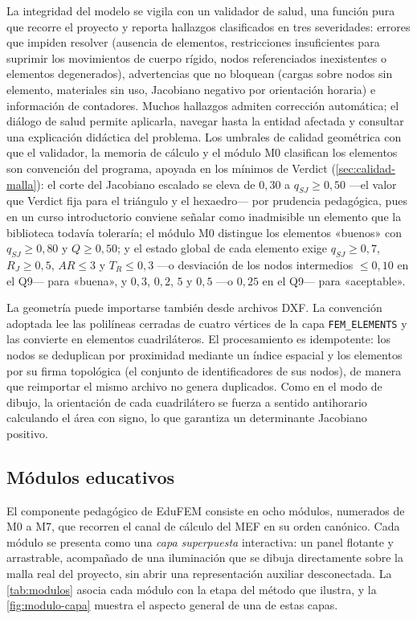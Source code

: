 La integridad del modelo se vigila con un validador de salud, una función pura que recorre el proyecto y reporta hallazgos clasificados en tres severidades: errores que impiden resolver (ausencia de elementos, restricciones insuficientes para suprimir los movimientos de cuerpo rígido, nodos referenciados inexistentes o elementos degenerados), advertencias que no bloquean (cargas sobre nodos sin elemento, materiales sin uso, Jacobiano negativo por orientación horaria) e información de contadores. Muchos hallazgos admiten corrección automática; el diálogo de salud permite aplicarla, navegar hasta la entidad afectada y consultar una explicación didáctica del problema. Los umbrales de calidad geométrica con que el validador, la memoria de cálculo y el módulo M0 clasifican los elementos son convención del programa, apoyada en los mínimos de Verdict (\autoref{sec:calidad-malla}): el corte del Jacobiano escalado se eleva de $0{,}30$ a $q_{SJ} \ge 0{,}50$ —el valor que Verdict fija para el triángulo y el hexaedro— por prudencia pedagógica, pues en un curso introductorio conviene señalar como inadmisible un elemento que la biblioteca todavía toleraría; el módulo M0 distingue los elementos «buenos» con $q_{SJ} \ge 0{,}80$ y $Q \ge 0{,}50$; y el estado global de cada elemento exige $q_{SJ} \ge 0{,}7$, $R_J \ge 0{,}5$, $AR \le 3$ y $T_R \le 0{,}3$ —o desviación de los nodos intermedios $\le 0{,}10$ en el Q9— para «buena», y $0{,}3$, $0{,}2$, $5$ y $0{,}5$ —o $0{,}25$ en el Q9— para «aceptable».

La geometría puede importarse también desde archivos DXF. La convención adoptada lee las polilíneas cerradas de cuatro vértices de la capa \texttt{FEM\_ELEMENTS} y las convierte en elementos cuadriláteros. El procesamiento es idempotente: los nodos se deduplican por proximidad mediante un índice espacial y los elementos por su firma topológica (el conjunto de identificadores de sus nodos), de manera que reimportar el mismo archivo no genera duplicados. Como en el modo de dibujo, la orientación de cada cuadrilátero se fuerza a sentido antihorario calculando el área con signo, lo que garantiza un determinante Jacobiano positivo.

\subsection{Módulos educativos}
\label{sec:educacion}

El componente pedagógico de EduFEM consiste en ocho módulos, numerados de M0 a M7, que recorren el canal de cálculo del MEF en su orden canónico. Cada módulo se presenta como una \emph{capa superpuesta} interactiva: un panel flotante y arrastrable, acompañado de una iluminación que se dibuja directamente sobre la malla real del proyecto, sin abrir una representación auxiliar desconectada. La \autoref{tab:modulos} asocia cada módulo con la etapa del método que ilustra, y la \autoref{fig:modulo-capa} muestra el aspecto general de una de estas capas.

